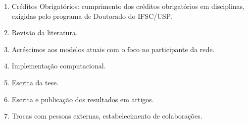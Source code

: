 \documentclass[a4paper,openright,12pt]{report} %
\begin{document}
\begin{enumerate}
\item Créditos Obrigatórios: cumprimento dos créditos obrigatórios em disciplinas, exigidas pelo programa de Doutorado do IFSC/USP.

\item Revisão da literatura.

\item Acréscimos aos modelos atuais com o foco no participante da rede.

\item Implementação computacional.

\item Escrita da tese.

\item Escrita e publicação dos resultados em artigos.

\item Trocas com pessoas externas, estabelecimento de colaborações.
\end{enumerate}
\end{document}
